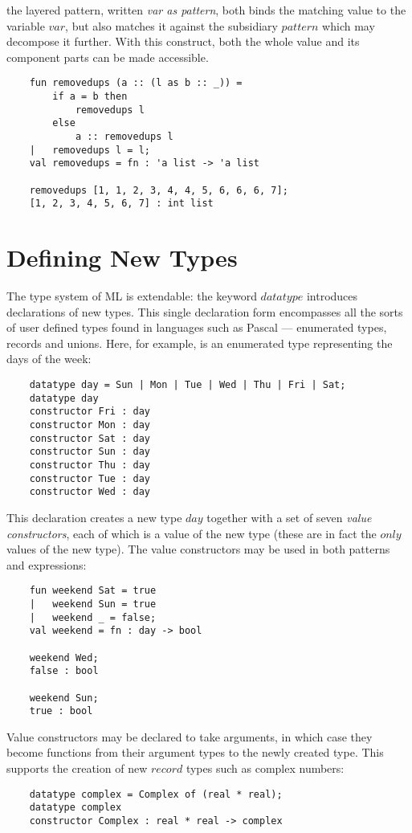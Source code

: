     the layered pattern, written {\em var as pattern}, both binds the
        matching value to the variable $var$, but also matches it against
        the subsidiary $pattern$ which may decompose it further. With
        this construct, both the whole value and its component parts can
        be made accessible.
\begin{verbatim}
    fun removedups (a :: (l as b :: _)) =
        if a = b then
            removedups l
        else
            a :: removedups l
    |   removedups l = l;
    val removedups = fn : 'a list -> 'a list

    removedups [1, 1, 2, 3, 4, 4, 5, 6, 6, 6, 7];
    [1, 2, 3, 4, 5, 6, 7] : int list
\end{verbatim}


\section{Defining New Types}

The type system of ML is extendable: the keyword $datatype$ introduces
declarations of new types. This single declaration form encompasses all
the sorts of user defined types found in languages such as Pascal ---
enumerated types, records and unions. Here, for example, is an
enumerated type representing the days of the week:
\begin{verbatim}
    datatype day = Sun | Mon | Tue | Wed | Thu | Fri | Sat;
    datatype day
    constructor Fri : day
    constructor Mon : day
    constructor Sat : day
    constructor Sun : day
    constructor Thu : day
    constructor Tue : day
    constructor Wed : day
\end{verbatim}

This declaration creates a new type $day$ together with a set of seven
{\em value constructors}, each of which is a value of the new type (these
are in fact the $only$ values of the new type). The value constructors
may be used in both patterns and expressions:
\begin{verbatim}
    fun weekend Sat = true
    |   weekend Sun = true
    |   weekend _ = false;
    val weekend = fn : day -> bool

    weekend Wed;
    false : bool

    weekend Sun;
    true : bool
\end{verbatim}

Value constructors may be declared to take arguments, in which case they
become functions from their argument types to the newly created type.
This supports the creation of new $record$ types such as complex
numbers:
\begin{verbatim}
    datatype complex = Complex of (real * real);
    datatype complex
    constructor Complex : real * real -> complex
\end{verbatim}

